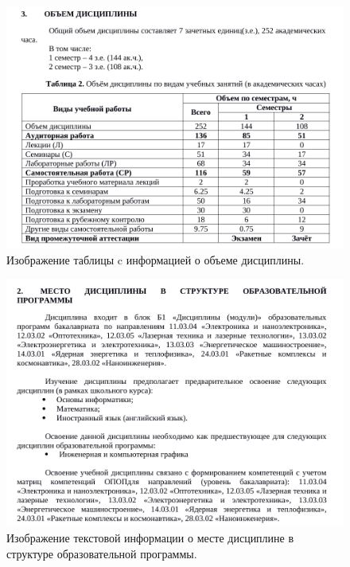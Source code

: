 \begin{figure}[h!]
	\begin{center}
		\includegraphics[scale=0.5]{img/rpd_example_02.png}
	\end{center}
	\captionsetup{justification=centering}
	\caption{Изображение таблицы c информацией о объеме дисциплины.}
	\label{img:rpd_example_01}
\end{figure}

\begin{figure}[h!]
	\begin{center}
		\includegraphics[scale=0.5]{img/rpd_example_01.png}
	\end{center}
	\captionsetup{justification=centering}
	\caption{Изображение текстовой информации о месте дисциплине в структуре образовательной программы.}
	\label{img:rpd_example_02}
\end{figure}

